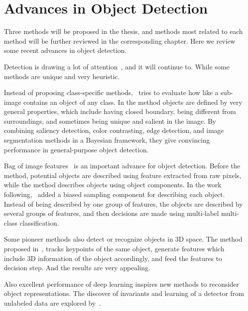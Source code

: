 \section{Advances in Object Detection}
\label{ch2p4}
Three methods will be proposed in the thesis, and methods most related to each method will be further reviewed in the corresponding chapter. Here we review some recent advances in object detection.

Detection is drawing a lot of attention~\citep{ij4,ac31,ac30,ac4,ac32,ac29,ac28,ac1,ac9,ac2,ac3,ac22,lb1,ac5,ac10,ac21,ac18}, and it will continue to. While some methods are unique and very heuristic.

Instead of proposing class-specific methods,~\citep{wiao} tries to evaluate how like a sub-image contains an object of any class. In the method objects are defined by very general properties, which include having closed boundary, being different from surroundings, and sometimes being unique and salient in the image. By combining saliency detection, color contrasting, edge detection, and image segmentation methods in a Bayesian framework, they give convincing performance in general-purpose object detection.

Bag of image features~\citep{bgf} is an important advance for object detection. Before the method, potential objects are described using feature extracted from raw pixels, while the method describes objects using object components. In the work following,~\citep{ij13} added a biased sampling component for describing each object. Instead of being described by one group of features, the objects are described by several groups of features, and then decisions are made using multi-label multi-class classification.

Some pioneer methods also detect or recognize objects in 3D space. The method proposed in~\citep{r3d}, tracks keypoints of the same object, generate features which include 3D information of the object accordingly, and feed the features to decision step. And the results are very appealing.

Also excellent performance of deep learning inspires new methods to reconsider   object representations. The discover of invariants and learning of a detector from unlabeled data are explored by~\citep{dnnnn}.


